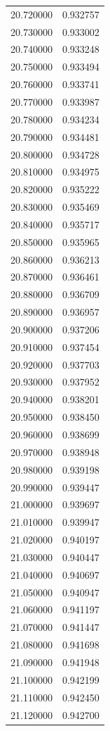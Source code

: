 \begin{tabular}{rr}
20.720000 & 0.932757 \\
20.730000 & 0.933002 \\
20.740000 & 0.933248 \\
20.750000 & 0.933494 \\
20.760000 & 0.933741 \\
20.770000 & 0.933987 \\
20.780000 & 0.934234 \\
20.790000 & 0.934481 \\
20.800000 & 0.934728 \\
20.810000 & 0.934975 \\
20.820000 & 0.935222 \\
20.830000 & 0.935469 \\
20.840000 & 0.935717 \\
20.850000 & 0.935965 \\
20.860000 & 0.936213 \\
20.870000 & 0.936461 \\
20.880000 & 0.936709 \\
20.890000 & 0.936957 \\
20.900000 & 0.937206 \\
20.910000 & 0.937454 \\
20.920000 & 0.937703 \\
20.930000 & 0.937952 \\
20.940000 & 0.938201 \\
20.950000 & 0.938450 \\
20.960000 & 0.938699 \\
20.970000 & 0.938948 \\
20.980000 & 0.939198 \\
20.990000 & 0.939447 \\
21.000000 & 0.939697 \\
21.010000 & 0.939947 \\
21.020000 & 0.940197 \\
21.030000 & 0.940447 \\
21.040000 & 0.940697 \\
21.050000 & 0.940947 \\
21.060000 & 0.941197 \\
21.070000 & 0.941447 \\
21.080000 & 0.941698 \\
21.090000 & 0.941948 \\
21.100000 & 0.942199 \\
21.110000 & 0.942450 \\
21.120000 & 0.942700 \\

\end{tabular}
